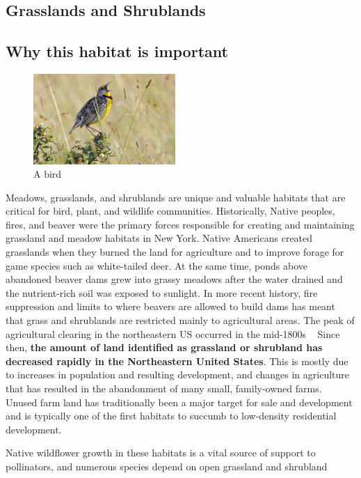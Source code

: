 \subsection{Grasslands and Shrublands}\label{subsec:grasslandsandshrublands}
\subsection*{Why this habitat is important}
\begin{figure}
    \includegraphics[width=0.48\textwidth]{images/bird.jpg}
  \caption{A bird}
\end{figure}
Meadows, grasslands, and shrublands are unique and valuable habitats that are 
critical for bird, plant, and wildlife communities. Historically, Native 
peoples, fires, and beaver were the primary forces responsible for creating and 
maintaining grassland and meadow habitats in New York. Native Americans created 
grasslands when they burned the land for agriculture and to improve forage for 
game species such as white-tailed deer. At the same time, ponds above abandoned 
beaver dams grew into grassy meadows after the water drained and the 
nutrient-rich soil was exposed to sunlight. In more recent history, fire 
suppression and limits to where beavers are allowed to build dams has meant that 
grass and shrublands are restricted mainly to agricultural areas. The peak of 
agricultural clearing in the northeastern US occurred in the mid-1800s 
~\citep{unhextension} Since then, \textbf{the amount of land identified as grassland or 
shrubland has decreased rapidly in the Northeastern United States}. This is 
mostly due to increases in population and resulting development, and changes in 
agriculture that has resulted in the abandonment of many small, family-owned 
farms. Unused farm land has traditionally been a major target for sale and 
development and is typically one of the first habitats to succumb to low-density 
residential development.
\par
Native wildflower growth in these habitats is a vital source of support to
pollinators, and numerous species depend on open grassland and shrubland
